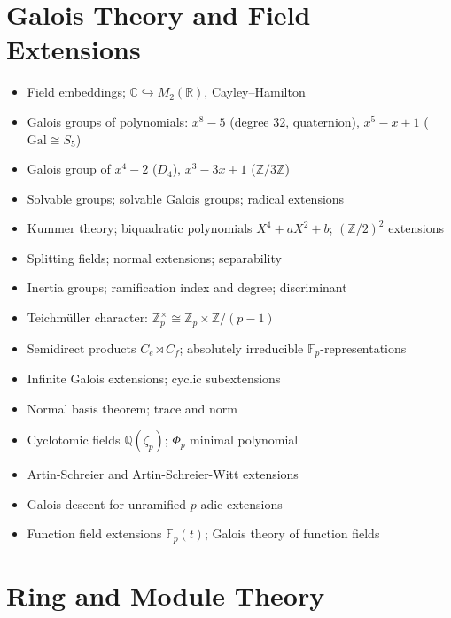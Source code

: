 \documentclass{amsart}
\begin{document}
\section{Galois Theory and Field Extensions}

\begin{itemize}
  \item Field embeddings; $\mathbb{C}\hookrightarrow M_2(\mathbb{R})$, Cayley--Hamilton
  \item Galois groups of polynomials: $x^8-5$ (degree 32, quaternion), $x^5-x+1$ ($\mathrm{Gal}\cong S_5$)
  \item Galois group of $x^4-2$ ($D_4$), $x^3-3x+1$ ($\mathbb{Z}/3\mathbb{Z}$)
  \item Solvable groups; solvable Galois groups; radical extensions
  \item Kummer theory; biquadratic polynomials $X^4+aX^2+b$; $(\mathbb{Z}/2)^2$ extensions
  \item Splitting fields; normal extensions; separability
  \item Inertia groups; ramification index and degree; discriminant
  \item Teichm\"uller character: $\mathbb{Z}_p^\times\cong\mathbb{Z}_p\times\mathbb{Z}/(p-1)$
  \item Semidirect products $C_e\rtimes C_f$; absolutely irreducible $\mathbb{F}_p$-representations
  \item Infinite Galois extensions; cyclic subextensions
  \item Normal basis theorem; trace and norm
  \item Cyclotomic fields $\mathbb{Q}(\zeta_p)$; $\Phi_p$ minimal polynomial
  \item Artin-Schreier and Artin-Schreier-Witt extensions
  \item Galois descent for unramified $p$-adic extensions
  \item Function field extensions $\mathbb{F}_p(t)$; Galois theory of function fields
\end{itemize}

\section{Ring and Module Theory}
\end{document}
